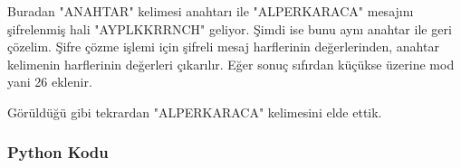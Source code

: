\newpage

Buradan "ANAHTAR" kelimesi anahtarı ile "ALPERKARACA" mesajını şifrelenmiş hali "AYPLKKRRNCH" geliyor. Şimdi ise bunu aynı anahtar ile geri çözelim. Şifre çözme işlemi için şifreli mesaj harflerinin değerlerinden, anahtar kelimenin harflerinin değerleri çıkarılır. Eğer sonuç sıfırdan küçükse üzerine mod yani 26 eklenir.

\begin{table}[ht]
\end{table}

Görüldüğü gibi tekrardan "ALPERKARACA" kelimesini elde ettik.

\subsubsection{Python Kodu}

